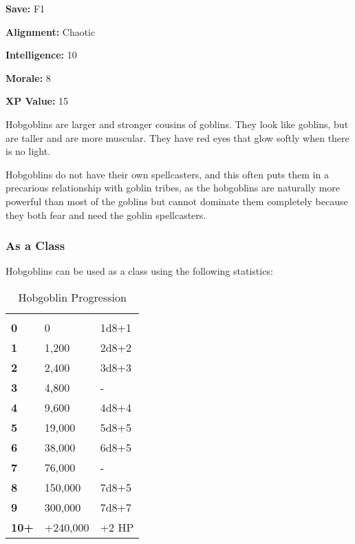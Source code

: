 \begin{multicols*}{2}
{\textbf{Save:} F1

\textbf{Alignment:} Chaotic

\textbf{Intelligence:} 10

\textbf{Morale:} 8

\textbf{XP Value:} 15}

Hobgoblins are larger and stronger cousins of goblins. They look like goblins, but are taller and are more muscular. They have red eyes that glow softly when there is no light.

Hobgoblins do not have their own spellcasters, and this often puts them in a precarious relationship with goblin tribes, as the hobgoblins are naturally more powerful than most of the goblins but cannot dominate them completely because they both fear and need the goblin spellcasters.

\subsubsection{As a Class}
Hobgoblins can be used as a class using the following statistics:


\begin {table}[H]
  \caption{Hobgoblin Progression}
  \begin{tabularx}{\columnwidth}{>{\bfseries}YYY}
	 &  & \\
	0 & 0 & 1d8+1\\
	1 & 1,200 & 2d8+2\\
	2 & 2,400 & 3d8+3\\
	3 & 4,800 & -\\
	4 & 9,600 & 4d8+4\\
	5 & 19,000 & 5d8+5\\
	6 & 38,000 & 6d8+5\\
	7 & 76,000 & -\\
	8 & 150,000 & 7d8+5\\
	9 & 300,000 & 7d8+7\\
	10+ & +240,000 & +2 HP
  \end {tabularx}
\end {table}


\end{multicols*}
